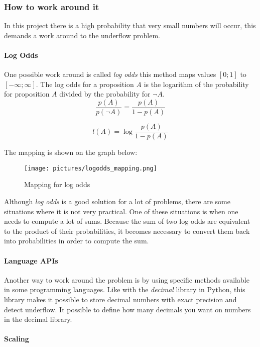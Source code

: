 \subsubsection{How to work around it}
In this project there is a high probability that very small numbers will occur, this demands a work around to the underflow problem. 
\paragraph{Log Odds}
One possible work around is called \textit{log odds} this method maps values $[0;1]$ to $[-\infty; \infty]$. The log odds for a proposition \textit{A} is the logarithm of the probability for proposition $A$ divided by the probability for $\neg A$.\\

    $$\frac{p(A)}{p(\neg A)} = \frac{p(A)}{1-p(A)}$$

    $$l(A) = \log \frac{p(A)}{1-p(A)}$$

    The mapping is shown on the graph below:\\
	\begin{figure}
		\centering
		\texttt{[image: pictures/logodds\_mapping.png]}
		\caption{Mapping for log odds}
		\label{fig:log_odds}
	\end{figure}

Although \textit{log odds} is a good solution for a lot of problems, there are some situations where
it is not very practical.
One of these situations is when one needs to compute a lot of sums.
Because the sum of two log odds are equivalent to the product of their probabilities, it becomes 
necessary to convert them back into probabilities in order to compute the sum.

\paragraph{Language APIs}
    Another way to work around the problem is by using specific methods available in some programming languages.
     Like with the \textit{decimal} library in Python, this library makes it possible to store decimal numbers with exact precision and detect underflow. 
     It possible to define how many decimals you want on numbers in the decimal library.

\paragraph{Scaling}

